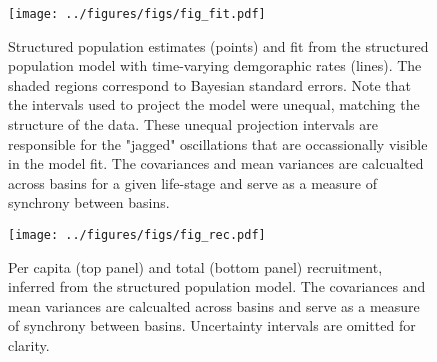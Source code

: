 \documentclass[11pt]{article}
\begin{document}














\clearpage



\clearpage
\begin{figure}
\centering
\texttt{[image: ../figures/figs/fig\_fit.pdf]}
\caption{\label{fig:fit}
Structured population estimates (points) and 
fit from the structured population model 
with time-varying demgoraphic rates (lines). 
The shaded regions correspond to Bayesian standard errors.
Note that the intervals used to project the model were unequal,
matching the structure of the data.
These unequal projection intervals are responsible for the "jagged" oscillations
that are occassionally visible in the model fit.
The covariances and mean variances are calcualted across basins for a given life-stage
and serve as a measure of synchrony between basins.
}
\end{figure}
\clearpage

\clearpage
\begin{figure}
\centering
\texttt{[image: ../figures/figs/fig\_rec.pdf]}
\caption{\label{fig:rec}
Per capita (top panel) and total (bottom panel) recruitment, 
inferred from the structured population model.
The covariances and mean variances are calcualted across basins
and serve as a measure of synchrony between basins.
Uncertainty intervals are omitted for clarity.
}
\end{figure}
\clearpage
\end{document}
